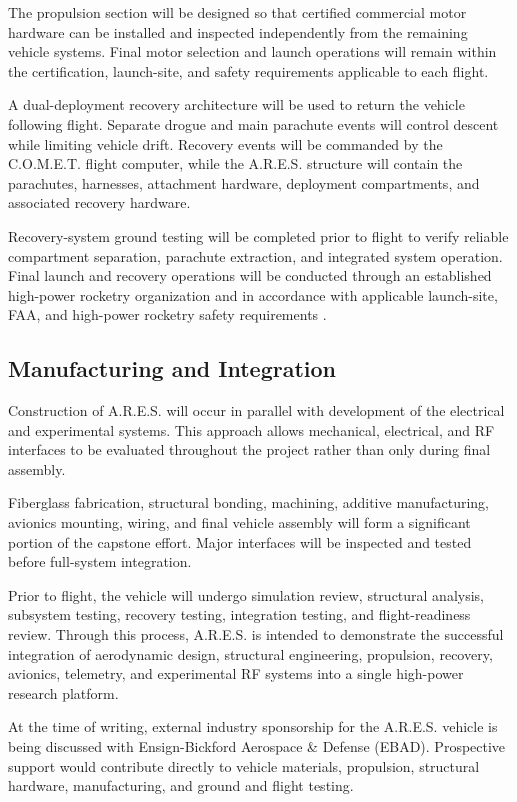 \documentclass[11pt,twocolumn]{IEEEtran}
\newcommand{\comet}{C.O.M.E.T.}
\newcommand{\ares}{A.R.E.S.}
\begin{document}
The propulsion section will be designed so that certified commercial motor hardware can be installed and inspected independently from the remaining vehicle systems. Final motor selection and launch operations will remain within the certification, launch-site, and safety requirements applicable to each flight.

A dual-deployment recovery architecture will be used to return the vehicle following flight. Separate drogue and main parachute events will control descent while limiting vehicle drift. Recovery events will be commanded by the \comet{} flight computer, while the \ares{} structure will contain the parachutes, harnesses, attachment hardware, deployment compartments, and associated recovery hardware.

Recovery-system ground testing will be completed prior to flight to verify reliable compartment separation, parachute extraction, and integrated system operation. Final launch and recovery operations will be conducted through an established high-power rocketry organization and in accordance with applicable launch-site, FAA, and high-power rocketry safety requirements \cite{narsafety}.

\subsection{Manufacturing and Integration}

Construction of \ares{} will occur in parallel with development of the electrical and experimental systems. This approach allows mechanical, electrical, and RF interfaces to be evaluated throughout the project rather than only during final assembly.

Fiberglass fabrication, structural bonding, machining, additive manufacturing, avionics mounting, wiring, and final vehicle assembly will form a significant portion of the capstone effort. Major interfaces will be inspected and tested before full-system integration.

Prior to flight, the vehicle will undergo simulation review, structural analysis, subsystem testing, recovery testing, integration testing, and flight-readiness review. Through this process, \ares{} is intended to demonstrate the successful integration of aerodynamic design, structural engineering, propulsion, recovery, avionics, telemetry, and experimental RF systems into a single high-power research platform.

At the time of writing, external industry sponsorship for the \ares{} vehicle is being discussed with Ensign-Bickford Aerospace \& Defense (EBAD). Prospective support would contribute directly to vehicle materials, propulsion, structural hardware, manufacturing, and ground and flight testing.
\end{document}
